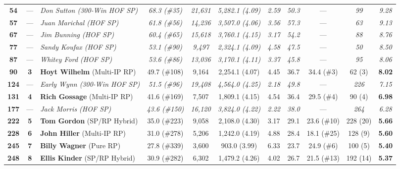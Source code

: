 \documentclass[11pt,letterpaper]{article}
\theoremstyle{plain}
\theoremstyle{definition}
\theoremstyle{remark}
\newcommand{\IP}{\mathrm{IP}}
\begin{document}
\begin{table}[htbp]
{\begin{tabular}{@{}cclcccccccc@{}}
\textbf{54} & --- & \emph{Don Sutton (300-Win HOF SP)} & \emph{68.3 (\#35)} & \emph{21,631} & \emph{5,282.1 (4.09)} & \emph{2.59} & \emph{50.3} & --- & \emph{99} & \emph{9.28} \\
\textbf{57} & --- & \emph{Juan Marichal (HOF SP)} & \emph{61.8 (\#56)} & \emph{14,236} & \emph{3,507.0 (4.06)} & \emph{3.56} & \emph{57.3} & --- & \emph{63} & \emph{9.13} \\
\textbf{67} & --- & \emph{Jim Bunning (HOF SP)} & \emph{60.4 (\#65)} & \emph{15,618} & \emph{3,760.1 (4.15)} & \emph{3.17} & \emph{54.2} & --- & \emph{88} & \emph{8.76} \\
\textbf{77} & --- & \emph{Sandy Koufax (HOF SP)} & \emph{53.1 (\#90)} & \emph{9,497} & \emph{2,324.1 (4.09)} & \emph{4.58} & \emph{47.5} & --- & \emph{50} & \emph{8.50} \\
\textbf{87} & --- & \emph{Whitey Ford (HOF SP)} & \emph{53.6 (\#86)} & \emph{13,036} & \emph{3,170.1 (4.11)} & \emph{3.37} & \emph{45.8} & --- & \emph{95} & \emph{8.06} \\
\textbf{90} & \textbf{3} & \textbf{Hoyt Wilhelm} (Multi-$\IP$ RP) & 49.7 (\#108) & 9,164 & 2,254.1 (4.07) & 4.45 & 36.7 & 34.4 (\#3) & 62 (3) & \textbf{8.02} \\
\midrule
\textbf{124} & --- & \emph{Early Wynn (300-Win HOF SP)} & \emph{51.5 (\#96)} & \emph{19,408} & \emph{4,564.0 (4.25)} & \emph{2.18} & \emph{49.8} & --- & \emph{226} & \emph{7.15} \\
\textbf{131} & \textbf{4} & \textbf{Rich Gossage} (Multi-$\IP$ RP) & 41.6 (\#169) & 7,507 & 1,809.1 (4.15) & 4.54 & 36.4 & 29.5 (\#4) & 90 (4) & \textbf{6.98} \\
\textbf{177} & --- & \emph{Jack Morris (HOF SP)} & \emph{43.6 (\#150)} & \emph{16,120} & \emph{3,824.0 (4.22)} & \emph{2.22} & \emph{38.0} & --- & \emph{264} & \emph{6.28} \\
\textbf{222} & \textbf{5} & \textbf{Tom Gordon} (SP/RP Hybrid) & 35.0 (\#223) & 9,058 & 2,108.0 (4.30) & 3.17 & 29.1 & 23.6 (\#10) & 228 (20) & \textbf{5.66} \\
\textbf{228} & \textbf{6} & \textbf{John Hiller} (Multi-$\IP$ RP) & 31.0 (\#278) & 5,206 & 1,242.0 (4.19) & 4.88 & 28.4 & 18.1 (\#25) & 128 (9) & \textbf{5.60} \\
\textbf{245} & \textbf{7} & \textbf{Billy Wagner} (Pure RP) & 27.8 (\#339) & 3,600 & 903.0 (3.99) & 6.33 & 23.7 & 24.9 (\#6) & 100 (5) & \textbf{5.40} \\
\textbf{248} & \textbf{8} & \textbf{Ellis Kinder} (SP/RP Hybrid) & 30.9 (\#282) & 6,302 & 1,479.2 (4.26) & 4.02 & 26.7 & 21.5 (\#13) & 192 (14) & \textbf{5.37} \\

\end{tabular}}
\end{table}
\end{document}
